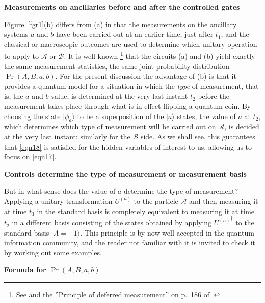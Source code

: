 \documentclass[12pt]{article} %
\def\outl#1{\par{\medskip\noindent\hspace*{.5cm}\bf
      \mathversion{bold}#1\mathversion{normal}\smallskip} }
\def\np{} \def\xa{} \def\xb{} \def\xn{} \def\xp{}
\def\outl#1{} \def\np{} \def\xa{} \def\xb{} \def\xn{} \def\xp{}
\def\outl#1{\par{\medskip\noindent\hspace*{.5cm}\bf
      \mathversion{bold}#1\mathversion{normal}\smallskip} }
\def\np{\newpage }\def\xn{\nopagebreak }\def\xp{\pagebreak }
\newcommand{\ad}{^\dagger }
\newcommand{\ket}[1]{|#1\rgl }
\newcommand{\rgl}{\rangle }
\newcommand{\AM}{{\mathcal A}}
\newcommand{\BM}{{\mathcal B}}
\begin{document}
\xb
\outl{Measurements on ancillaries before and after the controlled gates}
\xa


Figure~\ref{fgr1}(b) differs from (a) in that the measurements on the
ancillary systems $a$ and $b$ have been carried out at an earlier time, just
after $t_1$, and the classical or macroscopic outcomes are used to determine
which unitary operation to apply to $\AM$ or $\BM$.  It is well known%
\footnote{See \cite{GrNi96} and the ''Principle of deferred measurement'' on
  p.~186 of \cite{NlCh00}.} %
that the circuits (a) and (b) yield exactly the same measurement statistics,
the same joint probability distribution $\Pr(A,B,a,b)$. For the present
discussion the advantage of (b) is that it provides a quantum model for a
situation in which the \emph{type} of measurement, that is, the $a$ and $b$
value, is determined at the very last instant $t_2$ before the measurement
takes place through what is in effect flipping a quantum coin.  By choosing
the state $\ket{\phi_a}$ to be a superposition of the $\ket{a}$ states, the
value of $a$ at $t_2$, which determines which type of measurement will be
carried out on $\AM$, is decided at the very last instant; similarly for the
$\BM$ side.  As we shall see, this guarantees that \eqref{eqn18} is satisfied
for the hidden variables of interest to us, allowing us to focus on
\eqref{eqn17}.

\xb
\outl{Controls determine the type of measurement or measurement basis}
\xa


But in what sense does the value of $a$ determine the type of measurement?
Applying a unitary transformation $U^{(a)}$ to the particle $\AM$ and then
measuring it at time $t_3$ in the standard basis is completely equivalent to
measuring it at time $t_2$ in a different basis consisting of the states
obtained by applying ${U^{(a)}}\ad$ to the standard basis $\ket{A=\pm1}$. This
principle is by now well accepted in the quantum information community, and
the reader not familiar with it is invited to check it by working out some
examples.

\xb
\outl{Formula for $\Pr(A,B,a,b)$ }
\xa
\end{document}
